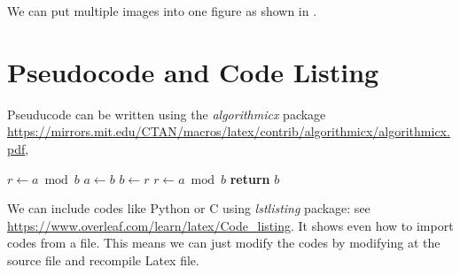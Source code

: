 We can put multiple images into one figure as shown in .

\section{Pseudocode and Code Listing}

Pseuducode can be written using the \textit{algorithmicx} package \url{https://mirrors.mit.edu/CTAN/macros/latex/contrib/algorithmicx/algorithmicx.pdf},

\begin{algorithm}
\caption{Euclid’s algorithm}\label{euclid}
\begin{algorithmic}[1]
\State $r\gets a\bmod b$
\State $a\gets b$
\State $b\gets r$
\State $r\gets a\bmod b$
\EndWhile\label{euclidendwhile}
\State \textbf{return} $b$
\EndProcedure
\end{algorithmic}
\end{algorithm}

We can include codes like Python or C using \textit{lstlisting} package: see \url{https://www.overleaf.com/learn/latex/Code_listing}. It shows even how to import codes from a file. This means we can just modify the codes by modifying at the source file and recompile Latex file. 

%
%
%
%
%

